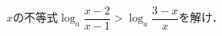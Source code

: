 \documentclass[../../main.tex]{subfiles}
\begin{document}
$x$の不等式$\displaystyle\log_a\dfrac{x-2}{x-1}>\log_a\dfrac{3-x}{x}$を解け．
\end{document}
